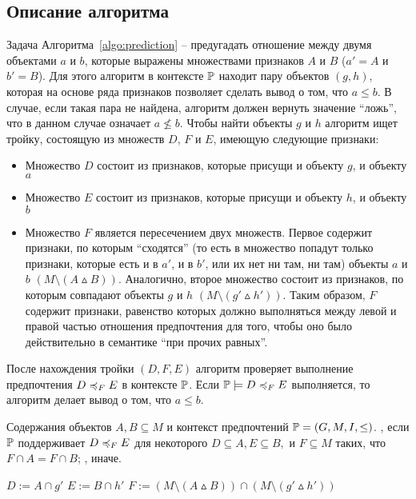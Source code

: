 	\subsection{Описание алгоритма}
	\label{subsec:cp_description}
		Задача Алгоритма~\ref{algo:prediction} – предугадать отношение между двумя объектами $a$ и $b$, которые выражены множествами признаков $A$ и $B$ ($a' = A$ и $b' = B$). Для этого алгоритм в контексте $\mathbb{P}$ находит пару объектов $(g, h)$, которая на основе ряда признаков позволяет сделать вывод о том, что $a \leq b$. В случае, если такая пара не найдена, алгоритм должен вернуть значение ``ложь'', что в данном случае означает $a \nleq b$. Чтобы найти объекты $g$ и $h$ алгоритм ищет тройку, состоящую из множеств $D$, $F$ и $E$, имеющую следующие признаки:
		\begin{itemize}
			\item Множество $D$ состоит из признаков, которые присущи и объекту $g$, и объекту $a$
			\item Множество $E$ состоит из признаков, которые присущи и объекту $h$, и объекту $b$
			\item Множество $F$ является пересечением двух множеств. Первое содержит признаки, по которым ``сходятся'' (то есть в множество попадут только признаки, которые есть и в $a'$, и в $b'$, или их нет ни там, ни там) объекты $a$ и $b$ $(M \setminus (A \vartriangle B))$. Аналогично, второе множество состоит из признаков, по которым совпадают объекты $g$ и $h$ $(M \setminus (g' \vartriangle h'))$. Таким образом, $F$ содержит признаки, равенство которых должно выполняться между левой и правой частью отношения предпочтения для того, чтобы оно было действительно в семантике \enquote{при прочих равных}.
		\end{itemize}
		После нахождения тройки $(D,F,E)$ алгоритм проверяет выполнение предпочтения $D \preccurlyeq_{F} E$ в контексте $\mathbb{P}$. Если $\PP \models \DEF$ выполняется, то алгоритм делает вывод о том, что $a \leq b$.
	
		\begin{algorithm}
			\caption{$(A, B, \PP)$ \cite[Алг.~1]{Obiedkov:2013}}
			\label{algo:prediction}
			\begin{algorithmic}[1]
				\REQUIRE Содержания объектов $A, B \subseteq M$ и контекст предпочтений $\mathbb{P} = (G, M, I, \leq)$.
				\ENSURE \TRUE, если $\mathbb{P}$ поддерживает $D \preccurlyeq_{F} E$ для некоторого $D \subseteq A, E \subseteq B,$ и $F \subseteq M$ таких, что $F \cap A = F \cap B$; \FALSE, иначе.
				\item[]
				\STATE $D := A \cap g'$
				\STATE $E := B \cap h'$
				\STATE $F := (M \setminus (A \vartriangle B)) \cap (M \setminus (g' \vartriangle h'))$
				\IF{$\PP \models \DEF$}
				\RETURN \TRUE
				\ENDIF
				\ENDFOR
				\ENDFOR
				\RETURN \FALSE
			\end{algorithmic}
		\end{algorithm}
		
